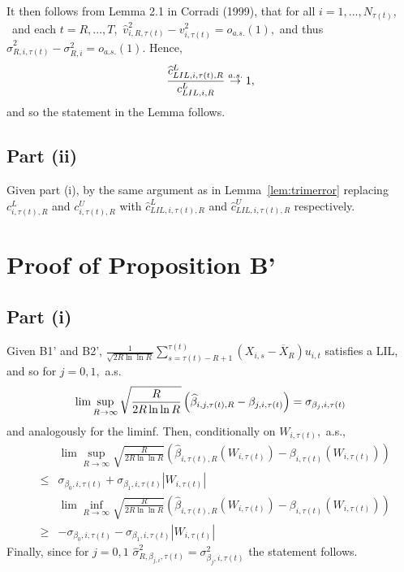 It then follows from Lemma 2.1 in Corradi (1999), that for all $%
i=1,...,N_{\tau(t)},$\ and each $t=R,...,T,$ $%
\widehat{v}_{i,R,\tau(t)}^{2}-v_{i,\tau(t)}^{2}=o_{a.s.}(1),$ and thus $\widehat{\sigma }%
_{R,i,\tau(t)}^{2}-\sigma _{R,i}^{2}=o_{a.s.}(1).$
Hence,%
\begin{equation*}
\frac{\widehat{c}_{LIL,i,\tau(t),R}^{L}}{%
c_{LIL,i,R}^{L}}\overset{a.s.}{\rightarrow }1,
\end{equation*}%
and so the statement in the Lemma follows.

\subsection{Part (ii)}

Given part (i), by the same argument as in Lemma~\ref{lem:trimerror} replacing $%
c_{i,\tau(t),R}^{L}$ and $c_{i,\tau(t),R}^{U} $ with $\widehat{c}_{LIL,i,\tau(t),R}^{L}$
and $\widehat{c}_{LIL,i,\tau(t),R}^{U}$
respectively.\medskip


\section{Proof of Proposition B'}

\subsection{Part (i)}

Given B1' and B2', $\frac{1}{\sqrt{2R\ln \ln R}}%
\sum_{s=\tau(t)-R+1}^{\tau(t)}\left( X_{i,s}-\overline{X}_{R}\right) u_{i,t}$ satisfies a
LIL, and so for $j=0,1,$ a.s.%
\begin{equation*}
\lim \sup_{R\rightarrow \infty }\sqrt{\frac{R}{2R\ln \ln R}}\left( \widehat{%
\beta }_{i,j,\tau(t),R}-\beta _{j,i,\tau(t)}\right) =\sigma _{\beta _{j},i,\tau(t)}
\end{equation*}%
and analogously for the liminf. Then, conditionally on $W_{i,\tau(t)},$ a.s.,%
\begin{eqnarray*}
&&\lim \sup_{R\rightarrow \infty }\sqrt{\frac{R}{2R\ln \ln R}}\left( 
\widehat{\beta }_{i,\tau(t),R}\left(
W_{i,\tau(t)}\right) -\beta _{i,\tau(t)}\left( W_{i,\tau(t)}\right)
\right) \\
&\leq &\sigma _{\beta _{0},i,\tau(t)}+\sigma
_{\beta _{1},i,\tau(t)}\left\vert
W_{i,\tau(t)}\right\vert
\end{eqnarray*}%
\begin{eqnarray*}
&&\lim \inf_{R\rightarrow \infty }\sqrt{\frac{R}{2R\ln \ln R}}\left( 
\widehat{\beta }_{i,\tau(t),R}\left(
W_{i,\tau(t)}\right) -\beta _{i,\tau(t)}\left( W_{i,\tau(t)}\right)
\right) \\
&\geq &-\sigma _{\beta _{0},i,\tau(t)}-\sigma
_{\beta _{1},i,\tau(t)}\left\vert
W_{i,\tau(t)}\right\vert
\end{eqnarray*}%
Finally, since for $j=0,1$ $\widehat{\sigma }_{R,\beta _{j,i},\tau(t)}^{2}=\sigma _{\beta _{j},i,\tau(t)}^{2}$ the statement follows.

